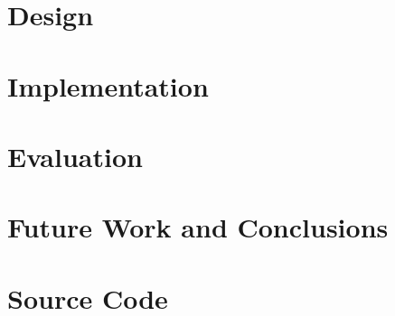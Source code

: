 \documentclass[MSc,12pt]{wsuthesis}
\begin{document}
\chapter{Design}
 

\chapter{Implementation}

  
\chapter{Evaluation}


\chapter{Future Work and Conclusions}




\newpage
\singlespacing



\appendix
\chapter{Source Code}

\end{document}
